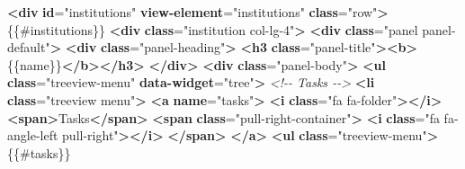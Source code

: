 \documentclass[
  11pt,
]{krantz}
\newenvironment{Shaded}{\begin{snugshade}}{\end{snugshade}}
\newcommand{\CommentTok}[1]{\textcolor[rgb]{0.37,0.37,0.37}{\textit{#1}}}
\newcommand{\ErrorTok}[1]{\textcolor[rgb]{0.14,0.14,0.14}{\textbf{#1}}}
\newcommand{\KeywordTok}[1]{\textcolor[rgb]{0.27,0.27,0.27}{\textbf{#1}}}
\newcommand{\NormalTok}[1]{#1}
\newcommand{\OtherTok}[1]{\textcolor[rgb]{0.37,0.37,0.37}{#1}}
\newcommand{\StringTok}[1]{\textcolor[rgb]{0.5,0.5,0.5}{#1}}
\begin{document}
\begin{Shaded}
\begin{Highlighting}[]
    \KeywordTok{\textless{}div} \ErrorTok{id}\OtherTok{=}\StringTok{"institutions"} \ErrorTok{view{-}element}\OtherTok{=}\StringTok{"institutions"} \ErrorTok{class}\OtherTok{=}\StringTok{"row"}\KeywordTok{\textgreater{}}
\NormalTok{        \{\{\#institutions\}\}}
            \KeywordTok{\textless{}div} \ErrorTok{class}\OtherTok{=}\StringTok{"institution col{-}lg{-}4"}\KeywordTok{\textgreater{}}
                \KeywordTok{\textless{}div} \ErrorTok{class}\OtherTok{=}\StringTok{"panel panel{-}default"}\KeywordTok{\textgreater{}}
                    \KeywordTok{\textless{}div} \ErrorTok{class}\OtherTok{=}\StringTok{"panel{-}heading"}\KeywordTok{\textgreater{}}
                        \KeywordTok{\textless{}h3} \ErrorTok{class}\OtherTok{=}\StringTok{"panel{-}title"}\KeywordTok{\textgreater{}\textless{}b\textgreater{}}\NormalTok{\{\{name\}\}}\KeywordTok{\textless{}/b\textgreater{}\textless{}/h3\textgreater{}}
                    \KeywordTok{\textless{}/div\textgreater{}}
                    \KeywordTok{\textless{}div} \ErrorTok{class}\OtherTok{=}\StringTok{"panel{-}body"}\KeywordTok{\textgreater{}}
                        \KeywordTok{\textless{}ul} \ErrorTok{class}\OtherTok{=}\StringTok{"treeview{-}menu"} \ErrorTok{data{-}widget}\OtherTok{=}\StringTok{"tree"}\KeywordTok{\textgreater{}}
                            \CommentTok{\textless{}!{-}{-} Tasks {-}{-}\textgreater{}}
                            \KeywordTok{\textless{}li} \ErrorTok{class}\OtherTok{=}\StringTok{"treeview menu"}\KeywordTok{\textgreater{}}
                                \KeywordTok{\textless{}a} \ErrorTok{name}\OtherTok{=}\StringTok{"tasks"}\KeywordTok{\textgreater{}}
                                    \KeywordTok{\textless{}i} \ErrorTok{class}\OtherTok{=}\StringTok{"fa fa{-}folder"}\KeywordTok{\textgreater{}\textless{}/i\textgreater{}} \KeywordTok{\textless{}span\textgreater{}}\NormalTok{Tasks}\KeywordTok{\textless{}/span\textgreater{}}
                                    \KeywordTok{\textless{}span} \ErrorTok{class}\OtherTok{=}\StringTok{"pull{-}right{-}container"}\KeywordTok{\textgreater{}}
                                    \KeywordTok{\textless{}i} \ErrorTok{class}\OtherTok{=}\StringTok{"fa fa{-}angle{-}left pull{-}right"}\KeywordTok{\textgreater{}\textless{}/i\textgreater{}}
                                \KeywordTok{\textless{}/span\textgreater{}}
                                \KeywordTok{\textless{}/a\textgreater{}}
                                \KeywordTok{\textless{}ul} \ErrorTok{class}\OtherTok{=}\StringTok{"treeview{-}menu"}\KeywordTok{\textgreater{}}
\NormalTok{                                    \{\{\#tasks\}\}}

\end{Highlighting}
\end{Shaded}
\end{document}
